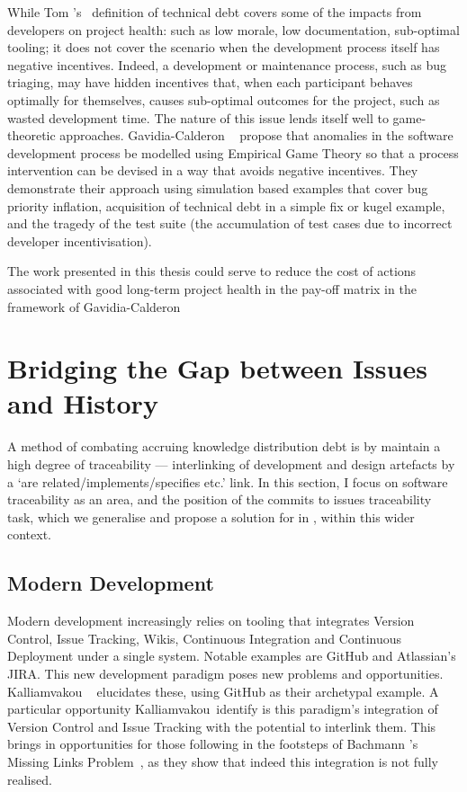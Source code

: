 While Tom \etal's~\cite{tom2013exploration} definition of technical debt covers
some of the impacts from developers on project health: such as low morale, low
documentation, sub-optimal tooling; it does not cover the scenario when the
development process itself has negative incentives. Indeed, a development or
maintenance process, such as bug triaging, may have hidden incentives that, when
each participant behaves optimally for themselves, causes sub-optimal outcomes
for the project, such as wasted development time. The nature of this issue lends
itself well to game-theoretic approaches. Gavidia-Calderon
\etal~\cite{gavidia2020game, gavidia2019assessor} propose that anomalies in the
software development process be modelled using Empirical Game Theory so that a
process intervention can be devised in a way that avoids negative incentives.
They demonstrate their approach using simulation based examples that cover bug
priority inflation, acquisition of technical debt in a simple fix or kugel
example, and the tragedy of the test suite (the accumulation of test cases due
to incorrect developer incentivisation). 

The work presented in this thesis could
serve to reduce the cost of actions associated with good long-term project
health in the pay-off matrix in the framework of Gavidia-Calderon \etal

\section{Bridging the Gap between Issues and History}
\label{chapter:literature:sec:am_rel_work}

A method of combating accruing knowledge distribution debt is by maintain a high
degree of traceability --- interlinking of development and design artefacts by a
`are related/implements/specifies etc.' link. In this section, I focus on
software traceability as an area, and the position of the commits to issues
traceability task, which we generalise and propose a solution for in
, within this wider context.

\subsection{Modern Development}
\label{chapter:literature:sec:am_rel_work:modern_dev}

Modern development increasingly relies on tooling that integrates Version
Control, Issue Tracking, Wikis, Continuous Integration and Continuous Deployment
under a single system. Notable examples are GitHub and Atlassian's JIRA. This
new development paradigm poses new problems and opportunities. Kalliamvakou
\etal~\cite{Kalliamvakou2014} elucidates these, using GitHub as their archetypal
example. A particular opportunity Kalliamvakou~\etal identify is this paradigm's
integration of Version Control and Issue Tracking with the potential to
interlink them. This brings in opportunities for those following in the
footsteps of Bachmann \etal's Missing Links Problem~\cite{MissingLinks}, as they
show that indeed this integration is not fully realised.

